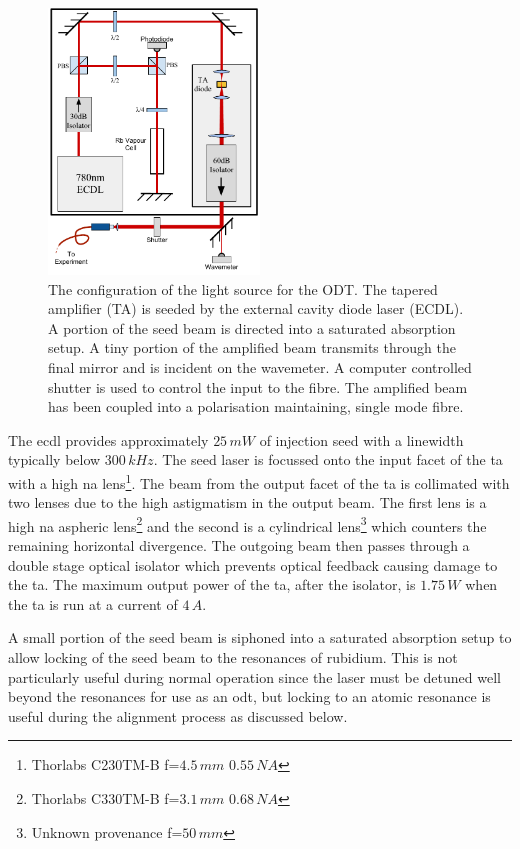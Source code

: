 \begin{figure}[h]
\centering
\includegraphics[width=0.5\textwidth]{figs/TAsetup.pdf}
\caption{The configuration of the light source for the ODT. The tapered amplifier (TA) is seeded by the external cavity diode laser (ECDL). A portion of the seed beam is directed into a saturated absorption setup. A tiny portion of the amplified beam transmits through the final mirror and is incident on the wavemeter. A computer controlled shutter is used to control the input to the fibre. The amplified beam has been coupled into a polarisation maintaining, single mode fibre.}
\label{fig:tasetup}
\end{figure}

The \gls{ecdl} provides approximately $25\,\unit{mW}$ of injection seed with a linewidth typically below $300\,\unit{kHz}$. The seed laser is focussed onto the input facet of the \gls{ta} with a high \gls{na} lens\footnote{Thorlabs C230TM-B f=$4.5\,\unit{mm}$ $0.55\,\unit{NA}$}. The beam from the output facet of the \gls{ta} is collimated with two lenses due to the high astigmatism in the output beam. The first lens is a high \gls{na} aspheric lens\footnote{Thorlabs C330TM-B f=$3.1\,\unit{mm}$ $0.68\,\unit{NA}$} and the second is a cylindrical lens\footnote{Unknown provenance f=$50\,\unit{mm}$} which counters the remaining horizontal divergence. The outgoing beam then passes through a double stage optical isolator which prevents optical feedback causing damage to the \gls{ta}. The maximum output power of the \gls{ta}, after the isolator, is $1.75\,\unit{W}$ when the \gls{ta} is run at a current of $4\,\unit{A}$.

A small portion of the seed beam is siphoned into a saturated absorption setup\cite{maguire_theoretical_2006, haroche_theory_1972, preston_doppler-free_1996} to allow locking of the seed beam to the resonances of rubidium. This is not particularly useful during normal operation since the laser must be detuned well beyond the resonances for use as an \gls{odt}, but locking to an atomic resonance is useful during the alignment process as discussed below.

